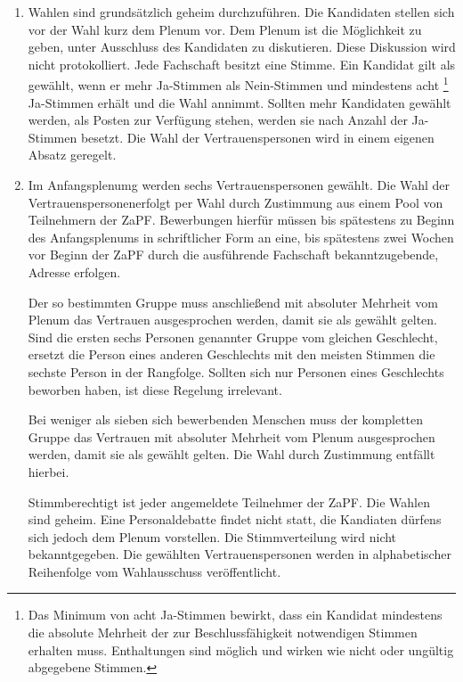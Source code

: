 \documentclass[draft,12pt,oneside]{scrreprt}
\begin{document}
\begin{enumerate}
  \item Wahlen sind grundsätzlich geheim durchzuführen. Die Kandidaten stellen sich vor der Wahl kurz
        dem Plenum vor. Dem Plenum ist die Möglichkeit zu geben, unter Ausschluss des Kandidaten zu
        diskutieren. Diese Diskussion wird nicht protokolliert. Jede Fachschaft besitzt eine Stimme. Ein Kandidat gilt als gewählt,
        wenn er mehr Ja-Stimmen als Nein-Stimmen und mindestens acht \footnote{Das Minimum von acht Ja-Stimmen bewirkt, dass ein Kandidat mindestens
        die absolute Mehrheit der zur Beschlussfähigkeit notwendigen Stimmen erhalten
        muss. Enthaltungen sind möglich und wirken wie nicht oder ungültig abgegebene Stimmen.} Ja-Stimmen erhält und die Wahl
        annimmt. Sollten mehr Kandidaten gewählt werden, als Posten zur
        Verfügung stehen, werden sie nach Anzahl der Ja-Stimmen besetzt.
        Die Wahl der Vertrauenspersonen wird in einem eigenen Absatz geregelt.

  \item Im Anfangsplenumg werden sechs Vertrauenspersonen gewählt.
        Die Wahl der Vertrauenspersonen\footnotemark erfolgt per Wahl durch Zustimmung aus
        einem Pool von Teilnehmern der ZaPF. Bewerbungen hierfür müssen bis spätestens zu Beginn
        des Anfangsplenums in schriftlicher Form an eine, bis spätestens zwei Wochen vor
        Beginn der ZaPF durch die ausführende Fachschaft bekanntzugebende, Adresse erfolgen.

        Der so bestimmten Gruppe muss anschließend mit absoluter Mehrheit vom Plenum
        das Vertrauen ausgesprochen werden, damit sie als gewählt gelten.
        Sind die ersten sechs Personen genannter Gruppe vom gleichen Geschlecht,
        ersetzt die Person eines anderen Geschlechts mit den meisten Stimmen die
        sechste Person in der Rangfolge.
        Sollten sich nur Personen eines Geschlechts beworben haben, ist diese Regelung irrelevant.

        Bei weniger als sieben sich bewerbenden Menschen muss der kompletten Gruppe
        das Vertrauen mit absoluter Mehrheit vom Plenum ausgesprochen werden,
        damit sie als gewählt gelten. Die Wahl durch Zustimmung entfällt hierbei.

        Stimmberechtigt ist jeder angemeldete Teilnehmer der ZaPF.
        Die Wahlen sind geheim. Eine Personaldebatte findet nicht statt,
        die Kandiaten dürfens sich jedoch dem Plenum vorstellen.
        Die Stimmverteilung wird nicht bekanntgegeben. Die gewählten Vertrauenspersonen
        werden in alphabetischer Reihenfolge vom Wahlausschuss veröffentlicht.


\end{enumerate}
\end{document}
